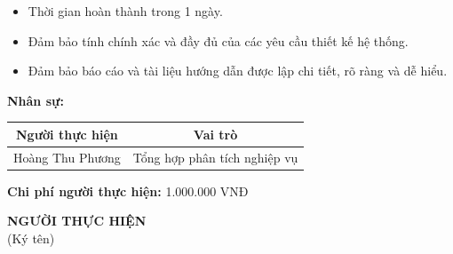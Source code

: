 {\begin{minipage}{\textwidth}
\begin{itemize}
            \item Thời gian hoàn thành trong 1 ngày.
            \item Đảm bảo tính chính xác và đầy đủ của các yêu cầu thiết kế hệ thống.
            \item Đảm bảo báo cáo và tài liệu hướng dẫn được lập chi tiết, rõ ràng và dễ hiểu.
        \end{itemize}
        \noindent \textbf{Nhân sự:}
        \begin{longtable}{|c|c|}
        \hline
        \textbf{Người thực hiện} & \textbf{Vai trò} \\
        \hline
        Hoàng Thu Phương & Tổng hợp phân tích nghiệp vụ \\
        \hline
        \end{longtable}
        \noindent \textbf{Chi phí người thực hiện:} 1.000.000 VNĐ
        \vspace{1cm}
        \begin{flushleft}
            \hspace{8cm} \textbf{NGƯỜI THỰC HIỆN} \\
            \hspace{9.5cm} (Ký tên) \\
            \vspace{1cm}
        \end{flushleft}
    \end{minipage}
}
